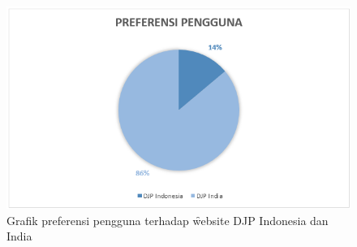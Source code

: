 \begin{figure}
	\centering
	\includegraphics[width=\textwidth]
	{pics/preferensipengguna.PNG}
	\caption{Grafik preferensi pengguna terhadap \f{website} DJP Indonesia dan India}
	\label{fig:preferensigraf}
\end{figure}
\pagebreak
